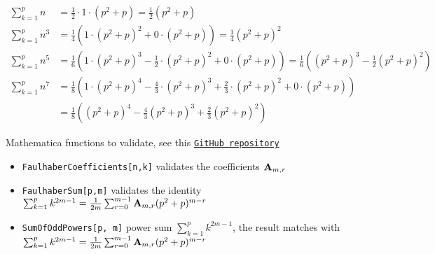 \begin{align*}
    \sum_{k=1}^{p} n
    &= \frac{1}{2} \cdot 1 \cdot (p^2 + p) = \frac{1}{2} \left(p^2+p\right) \\[8pt]
    \sum_{k=1}^{p} n^3
    &= \frac{1}{4} \left( 1 \cdot (p^2 + p)^2 + 0 \cdot (p^2 + p) \right) = \frac{1}{4} \left(p^2+p\right)^2 \\[8pt]
    \sum_{k=1}^{p} n^5
    &= \frac{1}{6} \left( 1 \cdot (p^2 + p)^3 - \frac{1}{2} \cdot (p^2 + p)^2 + 0 \cdot (p^2 + p) \right) = \frac{1}{6} \left(\left(p^2+p\right)^3-\frac{1}{2} \left(p^2+p\right)^2\right) \\[8pt]
    \sum_{k=1}^{p} n^7
    &= \frac{1}{8} \left( 1 \cdot (p^2 + p)^4 - \frac{4}{3} \cdot (p^2 + p)^3 + \frac{2}{3} \cdot (p^2 + p)^2 + 0 \cdot (p^2 + p) \right) \\
    &=\frac{1}{8} \left(\left(p^2+p\right)^4-\frac{4}{3} \left(p^2+p\right)^3+\frac{2}{3} \left(p^2+p\right)^2\right)
\end{align*}

Mathematica functions to validate, see this \href{https://github.com/kolosovpetro/faulhabers-coefficients-examples}{\texttt{GitHub repository}}
\begin{itemize}
    \item \texttt{FaulhaberCoefficients[n,k]} validates the coefficients ${\mathbf{A}} \sb{m,r}$
    \item \texttt{FaulhaberSum[p,m]} validates the identity $\sum_{k=1}^{p} k^{2m-1} = \frac{1}{2m} \sum_{r=0}^{m-1} {\mathbf{A}} \sb{m,r} (p^2+p)^{m-r}$
    \item \texttt{SumOfOddPowers[p, m]} power sum $\sum_{k=1}^{p} k^{2m-1}$, the result matches with $\sum_{k=1}^{p} k^{2m-1} = \frac{1}{2m} \sum_{r=0}^{m-1} {\mathbf{A}} \sb{m,r} (p^2+p)^{m-r}$
\end{itemize}
